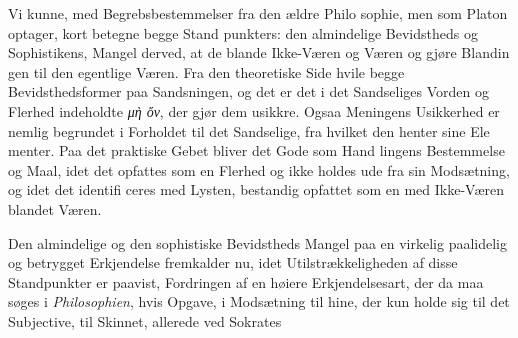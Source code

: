 \documentclass[12pt,a4paper]{book}
\newcommand{\gk}[1]{\textit{#1}}
\begin{document}
Vi kunne, med Begrebsbestemmelser fra den ældre Philo\-%
sophie, men som Platon optager, kort betegne begge Stand\-%
punkters: den almindelige Bevidstheds og Sophistikens, Mangel
derved, at de blande Ikke-Væren og Væren og gjøre Blandin\-%
gen til den egentlige Væren. Fra den theoretiske Side hvile
begge Bevidsthedsformer paa Sandsningen, og det er det i det
Sandseliges Vorden og Flerhed indeholdte \gk{μὴ ὄν}, der gjør dem
usikkre. Ogsaa Meningens Usikkerhed er nemlig begrundet
i Forholdet til det Sandselige, fra hvilket den henter sine Ele\-%
menter. Paa det praktiske Gebet bliver det Gode som Hand\-%
lingens Bestemmelse og Maal, idet det opfattes som en Flerhed
og ikke holdes ude fra sin Modsætning, og idet det identifi\-%
ceres med Lysten, bestandig opfattet som en med Ikke-Væren
blandet Væren.

Den almindelige og den sophistiske Bevidstheds Mangel
paa en virkelig paalidelig og betrygget Erkjendelse fremkalder
nu, idet Utilstrækkeligheden af disse Standpunkter er paavist,
Fordringen af en høiere Erkjendelsesart, der da maa søges i
\emph{Philosophien}, hvis Opgave, i Modsætning til hine, der kun
holde sig til det Subjective, til Skinnet, allerede ved Sokrates
\end{document}
